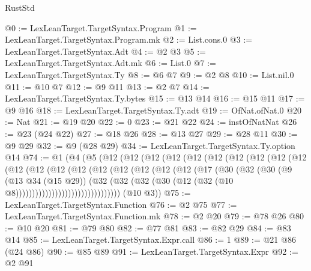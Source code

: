 \begin{lexlean}{RustStd}
\begin{coremodule}
@0 := LexLeanTarget.TargetSyntax.Program
@1 := LexLeanTarget.TargetSyntax.Program.mk
@2 := List.cons.{0}
@3 := LexLeanTarget.TargetSyntax.Adt
@4 := @2 @3
@5 := LexLeanTarget.TargetSyntax.Adt.mk
@6 := List.{0}
@7 := LexLeanTarget.TargetSyntax.Ty
@8 := @6 @7
@9 := @2 @8
@10 := List.nil.{0}
@11 := @10 @7
@12 := @9 @11
@13 := @2 @7
@14 := LexLeanTarget.TargetSyntax.Ty.bytes
@15 := @13 @14
@16 := @15 @11
@17 := @9 @16
@18 := LexLeanTarget.TargetSyntax.Ty.adt
@19 := OfNat.ofNat.{0}
@20 := Nat
@21 := @19 @20
@22 := 0
@23 := @21 @22
@24 := instOfNatNat
@26 := @23 (@24 @22)
@27 := @18 @26
@28 := @13 @27
@29 := @28 @11
@30 := @9 @29
@32 := @9 (@28 @29)
@34 := LexLeanTarget.TargetSyntax.Ty.option @14
@74 := @1
    (@4
      (@5
        (@12
          (@12
            (@12
              (@12
                (@12
                  (@12
                    (@12
                      (@12
                        (@12
                          (@12
                            (@12
                              (@12
                                (@12
                                  (@12
                                    (@12
                                      (@12
                                        (@12
                                          (@12
                                            (@12
                                              (@17
                                                (@30
                                                  (@32
                                                    (@30
                                                      (@9
                                                        (@13 @34 (@15 @29))
                                                        (@32
                                                          (@32
                                                            (@32
                                                              (@30
                                                                (@12
                                                                  (@32
                                                                    (@10
                                                                      @8))))))))))))))))))))))))))))))))
      (@10 @3))
@75 := LexLeanTarget.TargetSyntax.Function
@76 := @2 @75
@77 := LexLeanTarget.TargetSyntax.Function.mk
@78 := @2 @20
@79 := @78 @26
@80 := @10 @20
@81 := @79 @80
@82 := @77 @81
@83 := @82 @29
@84 := @83 @14
@85 := LexLeanTarget.TargetSyntax.Expr.call
@86 := 1
@89 := @21 @86 (@24 @86)
@90 := @85 @89
@91 := LexLeanTarget.TargetSyntax.Expr
@92 := @2 @91

\end{coremodule}
\end{lexlean}

